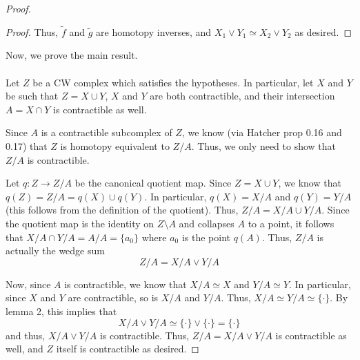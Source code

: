 \documentclass[fontsize=11pt]{scrartcl} %
\numberwithin{equation}{section} %
\numberwithin{figure}{section} %
\numberwithin{table}{section} %
\begin{document}
\begin{proof}
\begin{proof}
        Thus, $\tilde{f}$ and $\tilde{g}$ are homotopy inverses, and $X_1\vee
        Y_1\simeq X_2\vee Y_2$ as desired.
    \end{proof}
    Now, we prove the main result.
    \\
    \\
    Let $Z$ be a CW complex which satisfies the hypotheses. In particular, let
    $X$ and $Y$ be such that $Z=X\cup Y$, $X$ and $Y$ are both contractible, and
    their intersection $A=X\cap Y$ is contractible as well.

    Since $A$ is a contractible subcomplex of $Z$, we know (via Hatcher prop
    0.16 and 0.17) that $Z$ is homotopy equivalent to $Z/{A}$. Thus, we only
    need to show that $Z/{A}$ is contractible.

    Let $q:Z\to Z/{A}$ be the canonical quotient map. Since $Z=X\cup Y$, we know
    that $q(Z) = Z/{A} = q(X)\cup q(Y)$. In particular, $q(X) = X/{A}$ and $q(Y)
    = Y/{A}$ (this follows from the definition of the quotient). Thus, $Z/{A} =
    X/{A}\cup Y/{A}$. Since the quotient map is the identity on $Z\setminus A$
    and collapses $A$ to a point, it follows that $X/{A}\cap Y/{A} = A/{A} =
    \{a_0\}$ where $a_0$ is the point $q(A)$. Thus, $Z/{A}$ is actually the wedge
    sum 
    \[
        Z/{A} = X/{A}\vee Y/{A}
    \]
    
    Now, since $A$ is contractible, we know that $X/{A}\simeq X$ and
    $Y/{A}\simeq Y$. In particular, since $X$ and $Y$ are contractible, so is
    $X/{A}$ and $Y/{A}$. Thus, $X/{A}\simeq Y/{A}\simeq \{\cdot\}$. By lemma 2,
    this implies that
    \[
        X/{A}\vee Y/{A} \simeq \{\cdot\}\vee \{\cdot\} = \{\cdot\}
    \]
    and thus, $X/{A}\vee Y/{A}$ is contractible. Thus, $Z/{A} = X/{A}\vee Y/{A}$
    is contractible as well, and $Z$ itself is contractible as desired.
\end{proof}

\newpage
\end{document}
